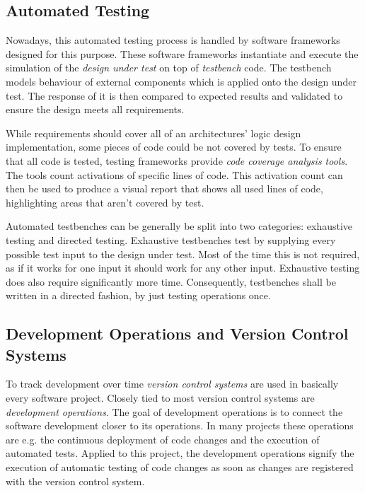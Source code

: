 \subsection{Automated Testing}
Nowadays, this automated testing process is handled by software frameworks designed for this purpose. These software frameworks instantiate and execute the simulation of the \textit{design under test} on top of \textit{testbench} code. The testbench models behaviour of external components which is applied onto the design under test. The response of it is then compared to expected results and validated to ensure the design meets all requirements.

While requirements should cover all of an architectures' logic design implementation, some pieces of code could be not covered by tests. To ensure that all code is tested, testing frameworks provide \textit{code coverage analysis tools}. The tools count activations of specific lines of code. This activation count can then be used to produce a visual report that shows all used lines of code, highlighting areas that aren't covered by test.

Automated testbenches can be generally be split into two categories: exhaustive testing and directed testing. Exhaustive testbenches test by supplying every possible test input to the design under test. Most of the time this is not required, as if it works for one input it should work for any other input. Exhaustive testing does also require significantly more time. Consequently, testbenches shall be written in a directed fashion, by just testing operations once.

\cite{verilogtestbench} \cite{exhaustivetesting} \cite{directedtesting}


\subsection{Development Operations and Version Control Systems}
To track development over time \textit{version control systems} are used in basically every software project. Closely tied to most version control systems are \textit{development operations}. The goal of development operations is to connect the software development closer to its operations. In many projects these operations are e.g. the continuous deployment of code changes and the execution of automated tests. Applied to this project, the development operations signify the execution of automatic testing of code changes as soon as changes are registered with the version control system. 

